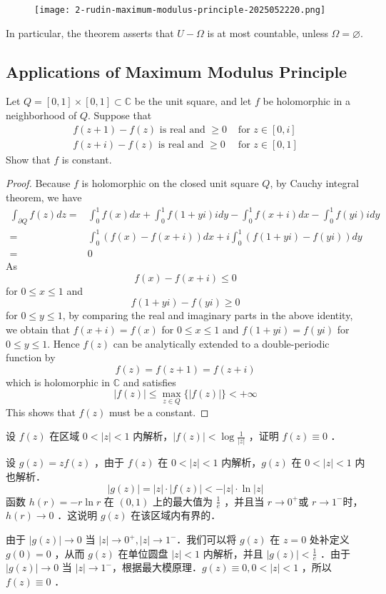 \begin{figure}[H]
\centering
\texttt{[image: 2-rudin-maximum-modulus-principle-2025052220.png]}
\label{}
\end{figure}

\begin{note}
In particular, the theorem asserts that $U-\Omega$ is at most countable, unless $\Omega=\varnothing$.
\end{note}
\subsection{Applications of Maximum Modulus Principle}

\begin{exercise}[Indiana]
Let $Q=[0,1] \times[0,1] \subset \mathbb{C}$ be the unit square, and let $f$ be holomorphic in a neighborhood of $Q$. Suppose that
\[
\begin{array}{ll}
f(z+1)-f(z) \text { is real and } \geq 0 & \text { for } z \in[0, i] \\
f(z+i)-f(z) \text { is real and } \geq 0 & \text { for } z \in[0,1]
\end{array}
\]Show that $f$ is constant.
\end{exercise}
\begin{proof}
Because $f$ is holomorphic on the closed unit square $Q$, by Cauchy integral theorem, we have
\[
\begin{aligned}
\int_{\partial Q} f(z) d z= & \int_0^1 f(x) d x+\int_0^1 f(1+y i) i d y-\int_0^1 f(x+i) d x -\int_0^1 f(y i) i d y \\
= & \int_0^1(f(x)-f(x+i)) d x+i \int_0^1(f(1+y i)-f(y i)) d y \\
= & 0
\end{aligned}
\]
As
\[
f(x)-f(x+i) \leq 0
\]
for $0 \leq x \leq 1$ and
\[
f(1+y i)-f(y i) \geq 0
\]
for $0 \leq y \leq 1$, by comparing the real and imaginary parts in the above identity, we obtain that $f(x+i)=f(x)$ for $0 \leq x \leq 1$ and $f(1+y i)=f(y i)$ for $0 \leq y \leq 1$. Hence $f(z)$ can be analytically extended to a double-periodic function by
\[
f(z)=f(z+1)=f(z+i)
\]
which is holomorphic in $\mathbb{C}$ and satisfies
\[
|f(z)| \leq \max _{z \in Q}\{|f(z)|\}<+\infty
\]
This shows that $f(z)$ must be a constant.
\end{proof}

\begin{exercise}
设 $f(z)$ 在区域 $0<|z|<1$ 内解析，$|f(z)|<\log \frac{1}{|z|}$ ，证明 $f(z) \equiv 0$ ．
\end{exercise}
设 $g(z)=z f(z)$ ，由于 $f(z)$ 在 $0<|z|<1$ 内解析，$g(z)$ 在 $0<|z|<1$ 内也解析．
\[
|g(z)|=|z| \cdot|f(z)|<-|z| \cdot \ln |z|
\]
函数 $h(r)=-r \ln r$ 在 $(0,1)$ 上的最大值为 $\frac{1}{e}$ ，并且当 $r \rightarrow 0^{+}$或 $r \rightarrow 1^{-}$时，$h(r) \rightarrow 0$ ．这说明 $g(z)$ 在该区域内有界的．

由于 $|g(z)| \rightarrow 0$ 当 $|z| \rightarrow 0^{+},|z| \rightarrow 1^{-}$．我们可以将 $g(z)$ 在 $z=0$ 处补定义 $g(0)=0$ ，从而 $g(z)$ 在单位圆盘 $|z|<1$ 内解析，并且 $|g(z)|<\frac{1}{e}$ ．由于 $|g(z)| \rightarrow 0$ 当 $|z| \rightarrow 1^{-}$，根据最大模原理．$g(z) \equiv 0,0<|z|<1$ ，所以 $f(z) \equiv 0$ ．
